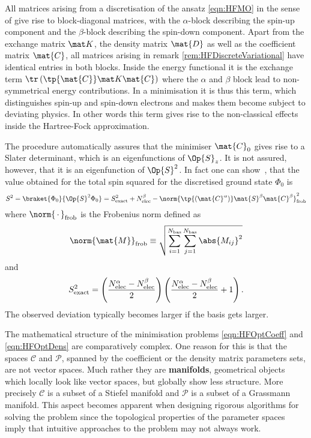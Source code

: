 \begin{rem}
	All matrices arising from a discretisation of the \HF ansatz \eqref{eqn:HFMO}
	in the sense of \UHF give rise to block-diagonal matrices,
	with the $\alpha$-block describing the
	spin-up component
	and the $\beta$-block describing the spin-down component.
	Apart from the exchange matrix $\matK$,
	the density matrix $\mat{D}$ as well as the coefficient matrix $\mat{C}$,
	all matrices arising in remark \ref{rem:HFDiscreteVariational}
	have identical entries in both blocks.
	Inside the \HF energy functional
	it is the exchange term $\tr \left(\tp{\mat{C}} \matK \mat{C}\right)$
	where the $\alpha$ and $\beta$ block lead to non-symmetrical
	energy contributions.
	In a minimisation it is thus this term, which distinguishes
	spin-up and spin-down electrons and makes them become subject to deviating physics.
	In other words this term gives rise to the non-classical effects
	inside the Hartree-Fock approximation.

	The \UHF procedure automatically assures that the minimiser $\mat{C}_0$
	gives rise to a Slater determinant,
	which is an eigenfunctions of $\Op{S}_z$.
	It is not assured, however, that it is an eigenfunction of $\Op{S}^2$.
	In fact one can show~\cite{Szabo1996},
	that the value obtained for the total spin squared
	for the discretised \HF ground state $\Phi_0$ is
	\begin{equation}
		\label{eqn:UHFS2}
		S^2 = \braket{\Phi_0}{\Op{S}^2 \Phi_0}
		=
		S^2_\text{exact} + \NelecB -
		\norm{
		\tp{\left(\mat{C}^\alpha\right)} \mat{S}^\beta \mat{C}^\beta
		}_\text{frob}^2
	\end{equation}
	where $\norm{\slot}_\text{frob}$ is the Frobenius norm defined as
	\begin{equation}
		\norm{\mat{M}}_\text{frob} \equiv \sqrt{
			\sum_{i=1}^{\Nbas} \sum_{j=1}^{\Nbas} \abs{M_{ij}}^2}
		\label{eqn:FrobeniusNorm}
	\end{equation}
	and
	\[ S^2_\text{exact}
		= \left(\frac{N_\text{elec}^\alpha - N_\text{elec}^\beta}{2}\right)
			\left(\frac{N_\text{elec}^\alpha - N_\text{elec}^\beta}{2} +1\right).
	\]
	The observed deviation typically becomes larger if the basis gets larger.

	The mathematical structure of the minimisation problems
	\eqref{eqn:HFOptCoeff} and \eqref{eqn:HFOptDens} are comparatively complex.
	One reason for this is that the spaces $\mathcal{C}$ and $\mathcal{P}$,
	spanned by the coefficient or the density matrix parameters sets,
	are not vector spaces.
	Much rather they are \textbf{manifolds},
	\ie geometrical objects which locally look like vector spaces,
	but globally show less structure.
	More precisely $\mathcal{C}$ is a subset of a Stiefel manifold
	and $\mathcal{P}$ is a subset of a Grassmann manifold.
	This aspect becomes apparent
	when designing rigorous algorithms for solving the \HF problem
	since the
	topological properties of the \HF parameter spaces
	imply that intuitive approaches to the problem may not always work.
\end{rem}

